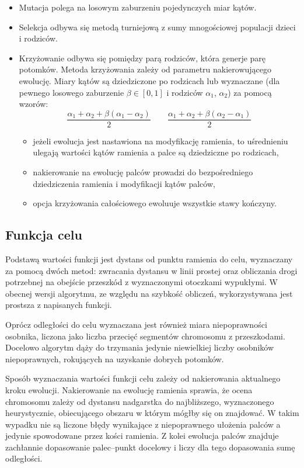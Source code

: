 \documentclass[11pt, leqno]{article}
\begin{document}
\begin{itemize}
	\item Mutacja polega na losowym zaburzeniu pojedynczych miar kątów.
	\item Selekcja odbywa się metodą turniejową z sumy mnogościowej populacji dzieci i rodziców.
	\item Krzyżowanie odbywa się pomiędzy parą rodziców, która generje parę potomków. Metoda krzyżowania zależy od parametru nakierowującego ewolucję. Miary kątów są dziedziczone po rodzicach lub wyznaczane (dla pewnego losowego zaburzenie $\beta\in[0, 1]$ i rodziców $\alpha_1$, $\alpha_2$) za pomocą wzorów:
	\[
		\frac{\alpha_1 + \alpha_2 + \beta(\alpha_1 - \alpha_2)}{2} \quad\quad \frac{\alpha_1 + \alpha_2 + \beta(\alpha_2 - \alpha_1)}{2}
	\]
	\begin{itemize}
		\item jeżeli ewolucja jest nastawiona na modyfikację ramienia, to uśrednieniu ulegają wartości kątów ramienia a palce są dziedziczne po rodzicach,
		\item nakierowanie na ewolucję palców prowadzi do bezpośredniego dziedziczenia ramienia i modyfikacji kątów palców,
		\item opcja krzyżowania całościowego ewoluuje wszystkie stawy kończyny.
	\end{itemize}
\end{itemize}

\subsection{Funkcja celu}
Podstawą wartości funkcji jest dystans od punktu ramienia do celu, wyznaczany za pomocą dwóch metod: zwracania dystansu w linii prostej oraz obliczania drogi potrzebnej na obejście przeszkód z wyznaczonymi otoczkami wypukłymi. W obecnej wersji algorytmu, ze względu na szybkość obliczeń, wykorzystywana jest prostsza z napisanych funkcji.

Oprócz odległości do celu wyznaczana jest również miara niepoprawności osobnika, liczona jako liczba przecięć segmentów chromosomu z przeszkodami. Docelowo algorytm dąży do trzymania jedynie niewielkiej liczby osobników niepoprawnych, rokujących na uzyskanie dobrych potomków.

Sposób wyznaczania wartości funkcji celu zależy od nakierowania aktualnego kroku ewolucji. Nakierowanie na ewolucję ramienia sprawia, że ocena chromosomu zależy od dystansu nadgarstka do najbliższego, wyznaczonego heurystycznie, obiecującego obszaru w którym mógłby się on znajdować. W takim wypadku nie są liczone błędy wynikające z niepoprawnego ułożenia palców a jedynie spowodowane przez kości ramienia. Z kolei ewolucja palców znajduje zachłannie dopasowanie palec--punkt docelowy i liczy dla tego dopasowania sumę odległości.
\end{document}
